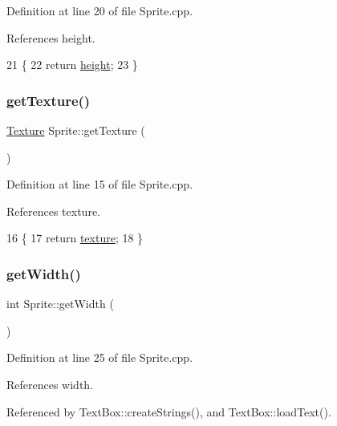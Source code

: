 Definition at line 20 of file Sprite.\+cpp.



References height.


\begin{DoxyCode}
21 \{
22     \textcolor{keywordflow}{return} \hyperlink{class_sprite_a1f07c8f2080c193759aec0e13503d7ab}{height};
23 \}
\end{DoxyCode}
\mbox{\label{class_sprite_a95126cbe568a388a5b1092dee95716d0}} 
\subsubsection{\texorpdfstring{get\+Texture()}{getTexture()}}
{\footnotesize\ttfamily \hyperlink{class_texture}{Texture} Sprite\+::get\+Texture (\begin{DoxyParamCaption}{ }\end{DoxyParamCaption})}



Definition at line 15 of file Sprite.\+cpp.



References texture.


\begin{DoxyCode}
16 \{
17     \textcolor{keywordflow}{return} \hyperlink{class_sprite_aa4978b284ebaae7225869d238dcb32cb}{texture};
18 \}
\end{DoxyCode}
\mbox{\label{class_sprite_aba3d4752461ec679fbf5de7ec4c34f61}} 
\subsubsection{\texorpdfstring{get\+Width()}{getWidth()}}
{\footnotesize\ttfamily int Sprite\+::get\+Width (\begin{DoxyParamCaption}{ }\end{DoxyParamCaption})}



Definition at line 25 of file Sprite.\+cpp.



References width.



Referenced by Text\+Box\+::create\+Strings(), and Text\+Box\+::load\+Text().


